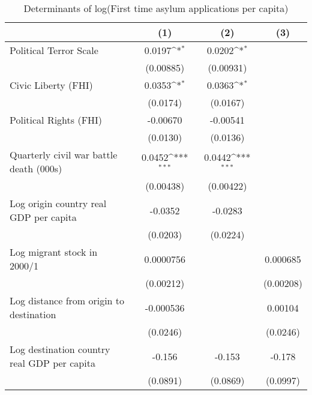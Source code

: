 \begin{table}[htbp]\centering
\def\sym#1{\ifmmode^{#1}\else\(^{#1}\)\fi}
\caption{Determinants of log(First time asylum applications per capita)}
\begin{tabular}{l*{3}{c}}
\hline\hline
                    &\multicolumn{1}{c}{(1)}         &\multicolumn{1}{c}{(2)}         &\multicolumn{1}{c}{(3)}         \\
\hline
Political Terror Scale&      0.0197\sym{*}  &      0.0202\sym{*}  &                     \\
                    &   (0.00885)         &   (0.00931)         &                     \\
[1em]
Civic Liberty (FHI) &      0.0353\sym{*}  &      0.0363\sym{*}  &                     \\
                    &    (0.0174)         &    (0.0167)         &                     \\
[1em]
Political Rights (FHI)&    -0.00670         &    -0.00541         &                     \\
                    &    (0.0130)         &    (0.0136)         &                     \\
[1em]
Quarterly civil war battle death (000s)&      0.0452\sym{***}&      0.0442\sym{***}&                     \\
                    &   (0.00438)         &   (0.00422)         &                     \\
[1em]
Log origin country real GDP per capita&     -0.0352         &     -0.0283         &                     \\
                    &    (0.0203)         &    (0.0224)         &                     \\
[1em]
Log migrant stock in 2000/1&   0.0000756         &                     &    0.000685         \\
                    &   (0.00212)         &                     &   (0.00208)         \\
[1em]
Log distance from origin to destination&   -0.000536         &                     &     0.00104         \\
                    &    (0.0246)         &                     &    (0.0246)         \\
[1em]
Log destination country real GDP per capita&      -0.156         &      -0.153         &      -0.178         \\
                    &    (0.0891)         &    (0.0869)         &    (0.0997)         \\

\end{tabular}
\end{table}
